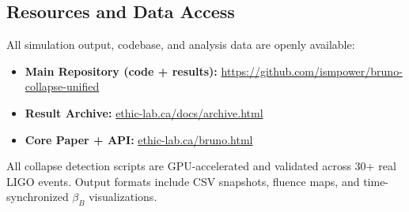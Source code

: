 \documentclass[12pt]{article}
\begin{document}
\vspace{1em}
\clearpage
\subsection*{Resources and Data Access}

All simulation output, codebase, and analysis data are openly available:

\begin{itemize}
  \item \textbf{Main Repository (code + results):} \url{https://github.com/ismpower/bruno-collapse-unified}
  \item \textbf{Result Archive:} \href{https://www.ethic-lab.ca/docs/archive.html}{ethic-lab.ca/docs/archive.html}
  \item \textbf{Core Paper + API:} \href{https://www.ethic-lab.ca/bruno.html}{ethic-lab.ca/bruno.html}
\end{itemize}

\noindent
All collapse detection scripts are GPU-accelerated and validated across 30+ real LIGO events. Output formats include CSV snapshots, fluence maps, and time-synchronized $\beta_B$ visualizations.

\vspace{2em}
\end{document}
